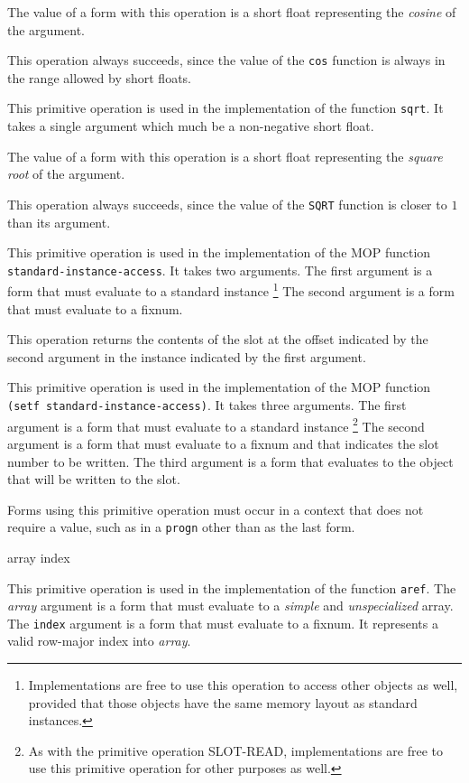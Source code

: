 The value of a form with this operation is a short float representing
the \emph{cosine} of the argument.

This operation always succeeds, since the value of the \texttt{cos}
function is always in the range allowed by short floats.

 {}

This primitive operation is used in the implementation of the
\commonlisp{} function \texttt{sqrt}.  It takes a single argument which
much be a non-negative short float.

The value of a form with this operation is a short float representing
the \emph{square root} of the argument.

This operation always succeeds, since the value of the \texttt{SQRT}
function is closer to $1$ than its argument.
 {}

This primitive operation is used in the implementation of the MOP
function \texttt{standard-instance-access}.  It takes two arguments.
The first argument is a form that must evaluate to a standard
instance%
\footnote{Implementations are free to use this operation to access
  other objects as well, provided that those objects have the same
  memory layout as standard instances.}
The second argument is a form that must evaluate to a fixnum.

This operation returns the contents of the slot at the offset
indicated by the second argument in the instance indicated by the
first argument.

 {}

This primitive operation is used in the implementation of the MOP
function \texttt{(setf standard-instance-access)}.  It takes three
arguments.  The first argument is a form that must evaluate to a
standard instance%
\footnote{As with the primitive operation SLOT-READ, implementations
  are free to use this primitive operation for other purposes as
  well.}
The second argument is a form that must evaluate to a fixnum and that
indicates the slot number to be written.  The third argument is a form
that evaluates to the object that will be written to the slot.

Forms using this primitive operation must occur in a context that does
not require a value, such as in a \texttt{progn} other than as the
last form.

 {array index}

This primitive operation is used in the implementation of the
\commonlisp{} function \texttt{aref}.  The \textit{array} argument is
a form that must evaluate to a \emph{simple} and \emph{unspecialized}
array.  The \texttt{index} argument is a form that must evaluate to a
fixnum.  It represents a valid row-major index into \textit{array}.

